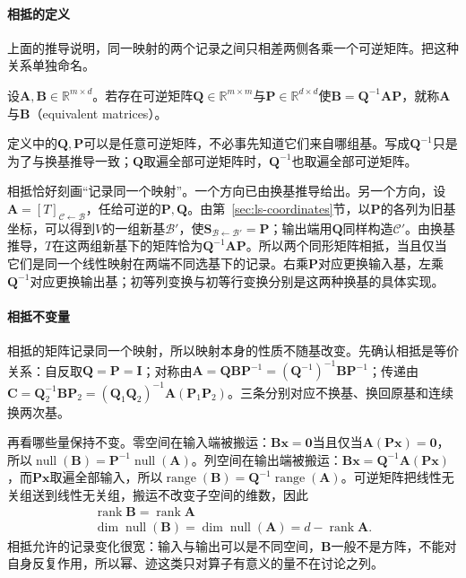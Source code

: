 \paragraph{相抵的定义}
\label{sec:ls-equivalence-meaning}
上面的推导说明，同一映射的两个记录之间只相差两侧各乘一个可逆矩阵。把这种关系单独命名。
\begin{definition}[矩阵相抵]
\label{def:ls-matrix-equivalence}
设$\bm A,\bm B\in\mathbb R^{m\times d}$。若存在可逆矩阵$\bm Q\in\mathbb R^{m\times m}$与$\bm P\in\mathbb R^{d\times d}$使$\bm B=\bm Q^{-1}\bm A\bm P$，就称$\bm A$与$\bm B$（equivalent matrices）。
\end{definition}
定义中的$\bm Q,\bm P$可以是任意可逆矩阵，不必事先知道它们来自哪组基。写成$\bm Q^{-1}$只是为了与换基推导一致；$\bm Q$取遍全部可逆矩阵时，$\bm Q^{-1}$也取遍全部可逆矩阵。

相抵恰好刻画“记录同一个映射”。一个方向已由换基推导给出。另一个方向，设$\bm A=[T]_{\mathcal C\leftarrow\mathcal B}$，任给可逆的$\bm P,\bm Q$。由第~\ref{sec:ls-coordinates}节，以$\bm P$的各列为旧基坐标，可以得到$V$的一组新基$\mathcal B'$，使$\bm S_{\mathcal B\leftarrow\mathcal B'}=\bm P$；输出端用$\bm Q$同样构造$\mathcal C'$。由换基推导，$T$在这两组新基下的矩阵恰为$\bm Q^{-1}\bm A\bm P$。所以两个同形矩阵相抵，当且仅当它们是同一个线性映射在两端不同选基下的记录。右乘$\bm P$对应更换输入基，左乘$\bm Q^{-1}$对应更换输出基；初等列变换与初等行变换分别是这两种换基的具体实现。

\paragraph{相抵不变量}
\label{sec:ls-equivalence-properties}
相抵的矩阵记录同一个映射，所以映射本身的性质不随基改变。先确认相抵是等价关系：自反取$\bm Q=\bm P=\bm I$；对称由$\bm A=\bm Q\bm B\bm P^{-1}=(\bm Q^{-1})^{-1}\bm B\bm P^{-1}$；传递由$\bm C=\bm Q_2^{-1}\bm B\bm P_2=(\bm Q_1\bm Q_2)^{-1}\bm A(\bm P_1\bm P_2)$。三条分别对应不换基、换回原基和连续换两次基。

再看哪些量保持不变。零空间在输入端被搬运：$\bm B\bm x=\bm0$当且仅当$\bm A(\bm P\bm x)=\bm0$，所以$\operatorname{null}(\bm B)=\bm P^{-1}\operatorname{null}(\bm A)$。列空间在输出端被搬运：$\bm B\bm x=\bm Q^{-1}\bm A(\bm P\bm x)$，而$\bm P\bm x$取遍全部输入，所以$\operatorname{range}(\bm B)=\bm Q^{-1}\operatorname{range}(\bm A)$。可逆矩阵把线性无关组送到线性无关组，搬运不改变子空间的维数，因此
\begin{equation}
\begin{gathered}
\operatorname{rank}\bm B=\operatorname{rank}\bm A\\
\dim\operatorname{null}(\bm B)=\dim\operatorname{null}(\bm A)=d-\operatorname{rank}\bm A.
\end{gathered}
\label{eq:ls-equivalence-invariants}
\end{equation}
相抵允许的记录变化很宽：输入与输出可以是不同空间，$\bm B$一般不是方阵，不能对自身反复作用，所以幂、迹这类只对算子有意义的量不在讨论之列。

